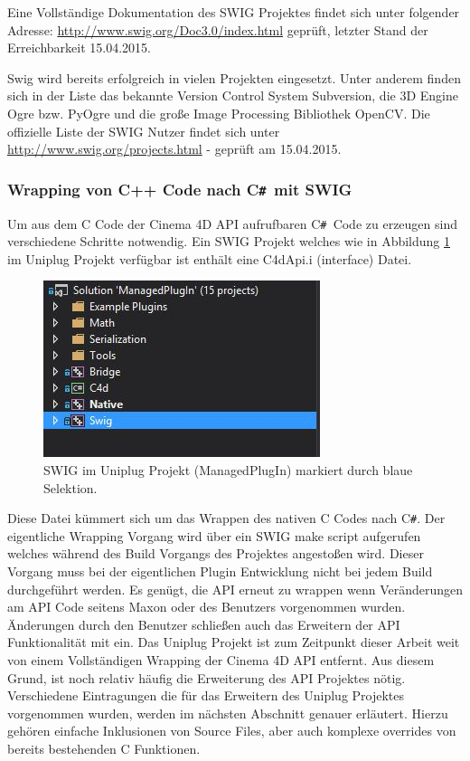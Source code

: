 \documentclass[pagesize, paper=a4, fontsize=12pt, titlepage=true, headings=small, headnosepline, abstractoff, liststotoc, nochapterprefix, plainheadsepline, twoside]{scrreprt}
\newcommand{\CS}{C\texttt{\#}}
\newcommand{\CSS}{C\texttt{\# }}
\newcommand{\CPPS}{C\nolinebreak\hspace{-.05em}\raisebox{.4ex}{\tiny\bf +}\nolinebreak\hspace{-.10em}\raisebox{.4ex}{\tiny\bf +} }
\begin{document}
Eine Vollständige Dokumentation des SWIG Projektes findet sich unter folgender Adresse: \url{http://www.swig.org/Doc3.0/index.html} geprüft, letzter Stand der Erreichbarkeit 15.04.2015.

Swig wird bereits erfolgreich in vielen Projekten eingesetzt. Unter anderem finden sich in der Liste das bekannte Version Control System Subversion, die 3D Engine Ogre bzw. PyOgre und die große Image Processing Bibliothek OpenCV. Die offizielle Liste der SWIG Nutzer findet sich unter \url{http://www.swig.org/projects.html} - geprüft am 15.04.2015.

\subsubsection{Wrapping von C++ Code nach \CSS mit SWIG}


Um aus dem \CPPS Code der Cinema 4D API aufrufbaren \CSS Code zu erzeugen sind verschiedene Schritte notwendig. Ein SWIG Projekt welches wie in Abbildung \ref{SWIGUniplug} im Uniplug Projekt verfügbar ist enthält eine C4dApi.i (interface) Datei.

\begin{figure}[ht]
	\centering
	\includegraphics[width=\linewidth/2]{Bilder/ProjektstrukturSwig.JPG}
	\caption{SWIG im Uniplug Projekt (ManagedPlugIn) markiert durch blaue Selektion.}
	\label{SWIGUniplug}
\end{figure}

Diese Datei kümmert sich um das Wrappen des nativen \CPPS Codes nach \CS. Der eigentliche Wrapping Vorgang wird über ein SWIG make script aufgerufen welches während des Build Vorgangs des Projektes angestoßen wird. Dieser Vorgang muss bei der eigentlichen Plugin Entwicklung nicht bei jedem Build durchgeführt werden. Es genügt, die API erneut zu wrappen wenn Veränderungen am API Code seitens Maxon oder des Benutzers vorgenommen wurden. Änderungen durch den Benutzer schließen auch das Erweitern der API Funktionalität mit ein. Das Uniplug Projekt ist zum Zeitpunkt dieser Arbeit weit von einem Vollständigen Wrapping der Cinema 4D API entfernt. Aus diesem Grund, ist noch relativ häufig die Erweiterung des API Projektes nötig. Verschiedene Eintragungen die für das Erweitern des Uniplug Projektes vorgenommen wurden, werden im nächsten Abschnitt genauer erläutert. Hierzu gehören einfache Inklusionen von Source Files, aber auch komplexe overrides von bereits bestehenden \CPPS Funktionen.
\end{document}
